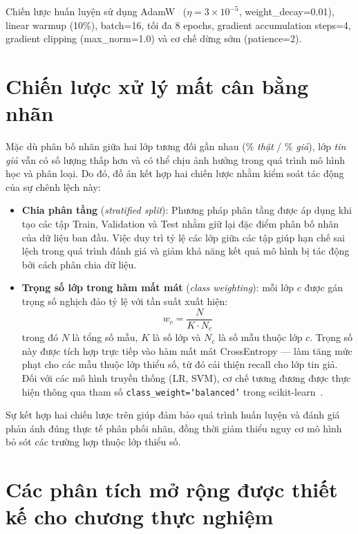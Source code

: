 Chiến lược huấn luyện sử dụng AdamW~\cite{loshchilov2019adamw} ($\eta = 3 \times 10^{-5}$, weight\_decay=0.01), linear warmup (10\%), batch=16, tối đa 8 epochs, gradient accumulation steps=4, gradient clipping (max\_norm=1.0) và cơ chế dừng sớm (patience=2).

\section{Chiến lược xử lý mất cân bằng nhãn}

Mặc dù phân bố nhãn giữa hai lớp tương đối gần nhau (\pctreal{}\% \textit{thật} / \pctfake{}\% \textit{giả}), lớp \textit{tin giả} vẫn có số lượng thấp hơn và có thể chịu ảnh hưởng trong quá trình mô hình học và phân loại. Do đó, đồ án kết hợp hai chiến lược nhằm kiểm soát tác động của sự chênh lệch này:

\begin{itemize}[leftmargin=2em]
\item \textbf{Chia phân tầng} (\textit{stratified split}): Phương pháp phân tầng được áp dụng khi tạo các tập Train, Validation và Test nhằm giữ lại đặc điểm phân bố nhãn của dữ liệu ban đầu. Việc duy trì tỷ lệ các lớp giữa các tập giúp hạn chế sai lệch trong quá trình đánh giá và giảm khả năng kết quả mô hình bị tác động bởi cách phân chia dữ liệu.

  \item \textbf{Trọng số lớp trong hàm mất mát} (\textit{class weighting}): mỗi lớp $c$ được gán trọng số nghịch đảo tỷ lệ với tần suất xuất hiện:
  \[
    w_c = \frac{N}{K \cdot N_c}
  \]
  trong đó $N$ là tổng số mẫu, $K$ là số lớp và $N_c$ là số mẫu thuộc lớp $c$. Trọng số này được tích hợp trực tiếp vào hàm mất mát CrossEntropy --- làm tăng mức phạt cho các mẫu thuộc lớp thiểu số, từ đó cải thiện recall cho lớp tin giả. Đối với các mô hình truyền thống (LR, SVM), cơ chế tương đương được thực hiện thông qua tham số \texttt{class\_weight=`balanced'} trong scikit-learn~\cite{pedregosa2011sklearn}.
\end{itemize}

Sự kết hợp hai chiến lược trên giúp đảm bảo quá trình huấn luyện và đánh giá phản ánh đúng thực tế phân phối nhãn, đồng thời giảm thiểu nguy cơ mô hình bỏ sót các trường hợp thuộc lớp thiểu số.

\section{Các phân tích mở rộng được thiết kế cho chương thực nghiệm}
\label{sec:extended_analyses}

